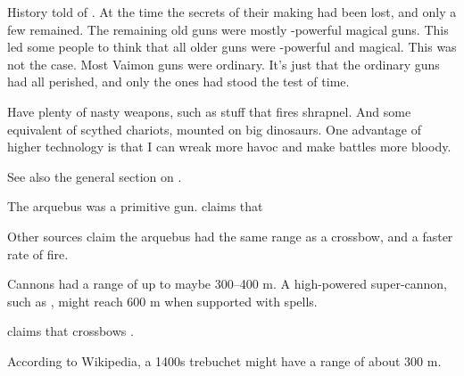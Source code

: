 History told of . 
At the time the secrets of their making had been lost, and only a few remained. 
The remaining old guns were mostly \uber-powerful magical guns. 
This led some people to think that all older guns were \uber-powerful and magical. 
This was not the case. 
Most Vaimon guns were ordinary. 
It's just that the ordinary guns had all perished, and only the \uber{} ones had stood the test of time. 

Have plenty of nasty weapons, such as stuff that fires shrapnel.
And some equivalent of scythed chariots, mounted on big dinosaurs. 
One advantage of higher technology is that I can wreak more havoc and make battles more bloody. 

See also the general section on . 



\begin{gloss}
    The arquebus was a primitive gun. 
    \cite{GarrettsBridges} claims that 
    
    Other sources claim the arquebus had the same range as a crossbow, and a faster rate of fire.
  
    Cannons had a range of up to maybe 300--400 m.
    A high-powered super-cannon, such as , might reach 600 m when supported with spells. 
  
    \cite{GarrettsBridges} claims that crossbows . 
  
    According to Wikipedia, a 1400s trebuchet might have a range of about 300 m.
\end{gloss}







































